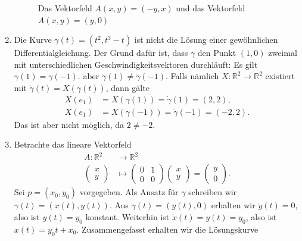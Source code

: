 \documentclass[../main.tex]{subfiles}
\begin{document}
\begin{examples}
\begin{enumerate}[(1)]
\begin{figure}[htb]
\begin{minipage}{0.50\textwidth}
        \end{minipage}%
        \caption{Das Vektorfeld $A(x, y) = (-y, x)$ und das
        Vektorfeld $A(x, y) = (y, 0)$}%
        \label{fig:vectorfields-examples}
      \end{figure}
    \item Die Kurve $\gamma(t) = (t^2, t^3 - t)$ ist
      nicht die Lösung einer gewöhnlichen Differentialgleichung.
      Der Grund dafür ist, dass $\gamma$ den Punkt
      $(1, 0)$ zweimal mit unterschiedlichen Geschwindigkeitsvektoren
      durchläuft: Es gilt $\gamma(1) = \gamma(-1)$.
      aber $\dot \gamma(1) \neq \dot \gamma(-1)$.
      Falls nämlich $X \colon \mathbb{R}^2 \to \mathbb{R}^2$ 
      existiert mit $\dot \gamma (t) = X ( \gamma(t))$,
      dann gälte
      \begin{align*}
        X(e_1) &= X(\gamma(1)) = \dot \gamma(1) = (2, 2),\\
        X(e_1) &= X(\gamma(-1)) = \dot \gamma(-1) = (-2, 2).
      \end{align*}
      Das ist aber nicht möglich, da $2 \neq -2$.
    \item Betrachte das lineare Vektorfeld
      \begin{align*}
        A \colon \mathbb{R}^2 & \to \mathbb{R}^2 \\
        \begin{pmatrix}
          x \\ y
        \end{pmatrix}
         & \mapsto 
         \begin{pmatrix}
           0 & 1 \\ 0 & 0
         \end{pmatrix}
         \begin{pmatrix}
           x \\ y
         \end{pmatrix}
         =
         \begin{pmatrix}
           y \\ 0
         \end{pmatrix}.
      \end{align*}
      Sei $p = (x_0, y_0)$ vorgegeben.
      Als Ansatz für $\gamma$
      schreiben wir $\gamma(t) = (x(t),
      y(t))$.
      Aus $\dot \gamma(t) = (y(t), 0)$ erhalten wir
      $\dot y (t) = 0$, also ist $y(t) = y_0$ konstant.
      Weiterhin ist
      $\dot x(t) = y(t) = y_0$, also ist
      $x(t) = y_0 t + x_0$. Zusammengefasst erhalten
      wir die Lösungskurve

\end{enumerate}
\end{examples}
\end{document}
